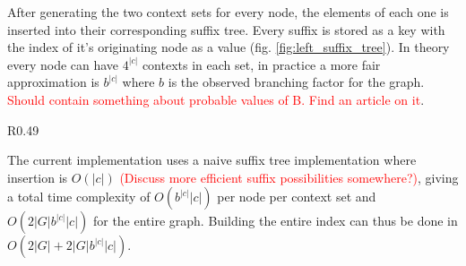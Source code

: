 \documentclass{article}
\begin{document}
\par\noindent
After generating the two context sets for every node, the elements of each one is inserted into their corresponding suffix tree. Every suffix is stored as a key with the index of it's originating node as a value (fig. \ref{fig:left_suffix_tree}). In theory every node can have $4^{|c|}$ contexts in each set, in practice a more fair approximation is $b^{|c|}$ where $b$ is the observed branching factor for the graph. \textcolor{red}{Should contain something about probable values of B. Find an article on it}. 
\begin{wrapfigure}{R}{0.49\textwidth}
  \begin{mdframed}
  \end{mdframed}
  \caption{The left suffix tree corresponding to the graph in \ref{fig:explicit_contexts}}
  \label{fig:left_suffix_tree}
\end{wrapfigure}
The current implementation uses a naive suffix tree implementation where insertion is $O(|c|)$ \textcolor{red}{(Discuss more efficient suffix possibilities somewhere?)}, giving a total time complexity of $O(b^{|c|}|c|)$ per node per context set and $O(2|G|b^{|c|}|c|)$ for the entire graph. Building the entire index can thus be done in $O(2|G| + 2|G|b^{|c|}|c|)$.
\end{document}
